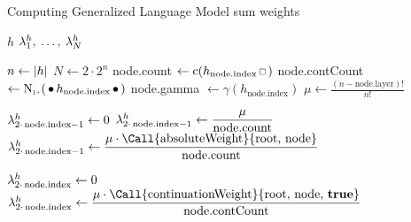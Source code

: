 \begin{algorithm}
  \caption{Computing Generalized Language Model sum weights}
  \label{alg:weightedsum-glm}
  \begin{algorithmic}[1]
    \Require $h$
    \Ensure $\lambda_1^h, \: \ldots, \: \lambda_N^h$

    \State $n \gets {\left|h\right|}$
    \State $N \gets 2 \cdot 2^n$
      \State node.count $\gets \Count(h_\text{node.index} \Skp)$
      \State node.contCount $\gets \ContCountIp(\WSkp h_\text{node.index} \WSkp)$
      \State node.gamma $\gets \gamma(h_\text{node.index})$
      \State $\mu \gets \frac{(n - \text{node.layer})!}{n!}$

      \vspace{1.0em}
        \State $\lambda_{2 \cdot\, \text{node.index} - 1}^h \gets 0$
        \State $\lambda_{2 \cdot\, \text{node.index} - 1}^h \gets \dfrac{\mu}{\text{node.count}}$
      \Else
        \State $\SumWeight_{2 \cdot\, \text{node.index} - 1}^h \gets \dfrac{\mu \cdot \text{\Call{absoluteWeight}{root, node}}}{\text{node.count}}$
      \EndIf

      \vspace{0.7em}
        \State $\lambda_{2 \cdot\, \text{node.index}}^h \gets 0$
      \Else
        \State $\SumWeight_{2 \cdot\, \text{node.index}}^h \gets \dfrac{\mu \cdot \text{\Call{continuationWeight}{root, node, \textbf{true}}}}{\text{node.contCount}}$
      \EndIf
    \EndFor
  \end{algorithmic}
\end{algorithm}

